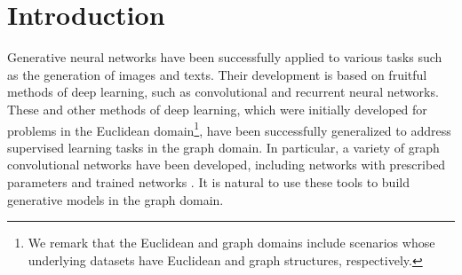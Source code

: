 \documentclass[conference]{IEEEtran}
\begin{document}
\section{Introduction}\label{sec:intro}
Generative neural networks have 
been successfully applied to various tasks such as the generation of images and texts.
Their development is based on fruitful methods of deep learning, such as convolutional and recurrent neural networks. These and other methods of deep learning, which were initially developed for problems in the Euclidean domain\footnote{We remark that the Euclidean and graph domains include scenarios whose underlying datasets have Euclidean and graph structures, respectively.}, have been successfully generalized to address supervised learning tasks in the graph domain. 
In particular, a variety of graph convolutional networks have been developed, including networks with prescribed parameters \cite{zou2018graph, gama2018diffusion} and trained networks \cite{henaff2015deep, defferrard2016convolutional, kipf2016semi, chen2017supervised}. It is natural to use these tools to build generative models in the graph domain.
\end{document}
